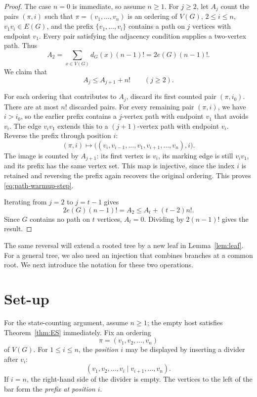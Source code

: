 \documentclass[11pt]{article}
\numberwithin{equation}{section}
\theoremstyle{definition}
\begin{document}
\begin{proof}
The case $n=0$ is immediate, so assume $n\geq1$.
For $j\geq2$, let $A_j$ count the pairs $(\pi,i)$ such that
$\pi=(v_1,\ldots,v_n)$ is an ordering of $V(G)$, $2\leq i\leq n$,
$v_1v_i\in E(G)$, and the prefix $\{v_1,\ldots,v_i\}$ contains a
path on $j$ vertices with endpoint $v_1$.  Every pair satisfying the
adjacency condition supplies a two-vertex path.  Thus
\[
        A_2=\sum_{x\in V(G)}d_G(x)(n-1)!=2e(G)(n-1)!.
\]
We claim that
\begin{equation}
        A_j\leq A_{j+1}+n!\qquad(j\geq2).
        \label{eq:path-warmup-step}
\end{equation}

For each ordering that contributes to $A_j$, discard its first counted
pair $(\pi,i_0)$.  There are at most $n!$ discarded pairs.  For every
remaining pair $(\pi,i)$, we have $i>i_0$, so the earlier prefix
contains a $j$-vertex path with endpoint $v_1$ that avoids $v_i$.
The edge $v_iv_1$ extends this to a $(j+1)$-vertex path with endpoint
$v_i$.  Reverse the prefix through position $i$:
\[
 (\pi,i)\longmapsto
 \bigl((v_i,v_{i-1},\ldots,v_1,v_{i+1},\ldots,v_n),i\bigr).
\]
The image is counted by $A_{j+1}$: its first vertex is $v_i$, its
marking edge is still $v_iv_1$, and its prefix has the same vertex set.
This map is injective, since the index $i$ is retained and reversing
the prefix again recovers the original ordering.  This proves
\eqref{eq:path-warmup-step}.

Iterating from $j=2$ to $j=t-1$ gives
\[
        2e(G)(n-1)!=A_2\leq A_t+(t-2)n!.
\]
Since $G$ contains no path on $t$ vertices, $A_t=0$.  Dividing by
$2(n-1)!$ gives the result.
\end{proof}

The same reversal will extend a rooted tree by a new leaf in
Lemma~\ref{lem:leaf}.  For a general tree, we also need an injection
that combines branches at a common root.  We next introduce the notation
for these two operations.

\section{Set-up}

For the state-counting argument, assume $n\geq1$; the empty host
satisfies Theorem~\ref{thm:ES} immediately.  Fix an ordering
\[
        \pi=(v_1,v_2,\ldots,v_n)
\]
of $V(G)$.  For $1\leq i\leq n$, the \emph{position $i$} may be displayed by
inserting a divider after $v_i$:
\begin{equation}
 (v_1,v_2,\ldots,v_i\mid v_{i+1},\ldots,v_n).
 \label{eq:position-display}
\end{equation}
If $i=n$, the right-hand side of the divider is empty.  The vertices to
the left of the bar form the \emph{prefix at position $i$}.
\end{document}
